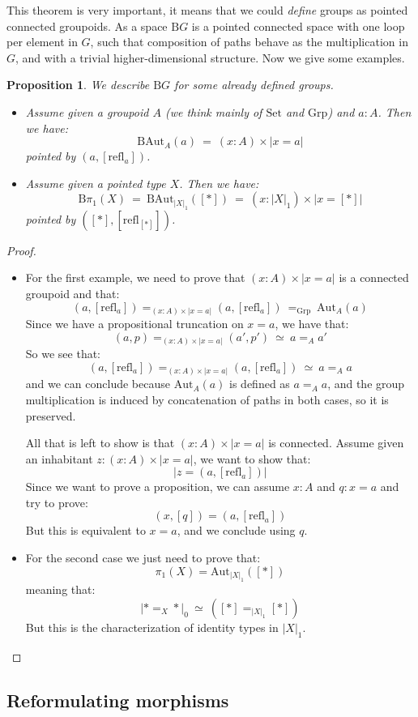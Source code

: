 \documentclass{article}
\newcommand{\sse}[1]{\medbreak \subsection{#1}}
\newcommand{\refl}{\mathrm{refl}}
\newcommand{\Grp}{\mathrm{Grp}}
\newcommand{\B}{\mathrm{B}}
\newcommand{\Aut}{\mathrm{Aut}}
\newcommand{\Set}{\mathrm{Set}}
\newtheorem{proposition}{Proposition}
\begin{document}
This theorem is very important, it means that we could \emph{define} groups as pointed connected groupoids. As a space $\B G$ is a pointed connected space with one loop per element in $G$, such that composition of paths behave as the multiplication in $G$, and with a trivial higher-dimensional structure. Now we give some examples.

\begin{proposition}
We describe $\B G$ for some already defined groups.
\begin{itemize}
\item Assume given a groupoid $A$ (we think mainly of $\Set$ and $\Grp$) and $a:A$. Then we have:
\[\B \Aut_A(a) \ = \ (x:A)\times |x=a|\]
pointed by $(a,[\refl_a])$.
\item Assume given a pointed type $X$. Then we have:
\[\B\pi_1(X) \ = \ \B\Aut_{|X|_1}([*])\ = \ (x:|X|_1)\times |x=[*]|\]
pointed by $([*],[\refl_{[*]}])$.
\end{itemize}
\end{proposition}
\begin{proof}
\begin{itemize}
\item For the first example, we need to prove that $(x:A)\times |x=a|$ is a connected groupoid and that: 
\[(a,[\refl_a]) =_{(x:A)\times |x=a|}(a,[\refl_a])\ =_\Grp\ \Aut_A(a)\]
Since we have a propositional truncation on $x=a$, we have that:
\[(a,p) =_{(x:A)\times |x=a|} (a',p') \ \simeq \ a=_Aa'\]
So we see that:
\[(a,[\refl_a]) =_{(x:A)\times |x=a|}(a,[\refl_a])\ \simeq\ a=_Aa\]
and we can conclude because $\Aut_A(a)$ is defined as $a=_Aa$, and the group multiplication is induced by concatenation of paths in both cases, so it is preserved.

All that is left to show is that $(x:A)\times |x=a|$ is connected. Assume given an inhabitant $z:(x:A)\times |x=a|$, we want to show that:
\[|z = (a,[\refl_a])|\]
Since we want to prove a proposition, we can assume $x:A$ and $q:x=a$ and try to prove:
\[(x,[q]) = (a,[\refl_a])\]
But this is equivalent to $x=a$, and we conclude using $q$.

\item For the second case we just need to prove that: 
\[\pi_1(X) = \Aut_{|X|_1}([*])\]
meaning that:
\[|*=_X*|_0 \ \simeq\ ([*] =_{|X|_1} [*])\] 
But this is the characterization of identity types in $|X|_1$. 
\end{itemize} 
\end{proof}


\sse{Reformulating morphisms}
\end{document}
